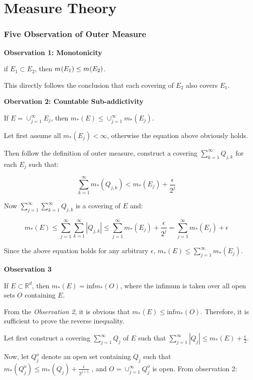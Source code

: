 \documentclass[
]{article}
\date{}
\begin{document}
\section{Measure Theory}

\hypertarget{header-n0}{%
\subsubsection{Five Observation of Outer Measure}\label{header-n0}}

\textbf{Observation 1: Monotonicity}

if \(E_1 \subset E_2\), then \(m_{\*}(E_1)\leq m_{\*}(E_2)\).

This directly follows the conclusion that each covering of \(E_2\) also
covers \(E_1\).

\textbf{Obervation 2: Countable Sub-addictivity}

If \(E = \cup_{j=1}^{\infty}E_j\), then
\(m_{*}(E)\leq\cup_{j=1}^{\infty}m_{*}(E_j)\).

Let first assume all \(m_*(E_j)<\infty\), otherwise the equation above
obviously holds.

Then follow the definition of outer measure, construct a covering
\(\sum_{k=1}^{\infty}Q_{j,k}\) for each \(E_j\) such that:

\[\sum_{k=1}^{\infty}m_{*}(Q_{j,k}) < m_{*}(E_j) + \frac{\epsilon}{2^j}\]

Now \(\sum_{j=1}^{\infty}\sum_{k=1}^{\infty}Q_{j, k}\) is a covering of
\(E\) and:

\[m_{*}(E)\leq \sum_{j=1}^{\infty}\sum_{k=1}^{\infty}|Q_{j, k}|\leq\sum_{j=1}^{\infty}m_*(E_j)+\frac{\epsilon}{2^j}=\sum_{j=1}^{\infty}m_*(E_j)+\epsilon\]

Since the above equation holds for any arbitrary \(\epsilon\),
\(m_*(E)\leq\sum_{j=1}^{\infty}m_*(E_j)\).

\textbf{Observation 3}

If \(E \subset\mathbb{R}^d\), then \(m_*(E)=\mathrm{inf}m_*(O)\), where the
infimum is taken over all open sets \(O\) containing \(E\).

From the \emph{Observation 2}, it is obvious that
\(m_*(E)\leq \mathrm{inf}m_*(O)\). Therefore, it is sufficient to prove
the reverse inequality.

Let first construct a covering \(\sum_{j=1}^{\infty}Q_j\) of \(E\) such
that \(\sum_{j=1}^{\infty}|Q_j|\leq m_*(E)+\frac{\epsilon}{2}\).

Now, let \(Q_{j}^o\) denote an open set containing \(Q_j\) such that
\(m_*(Q_j^o)\leq m_*(Q_j)+\frac{\epsilon}{2^{j+1}} \) , and
\(O=\cup_{j=1}^{\infty}Q_{j}^o\) is open. From observation 2:
\end{document}
